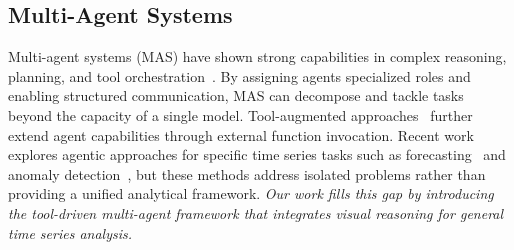 \subsection{Multi-Agent Systems}
Multi-agent systems (MAS) have shown strong capabilities in complex reasoning, planning, and tool orchestration~\cite{wu2024autogen,hong2023metagpt,qian2023chatdev}. 
By assigning agents specialized roles and enabling structured communication, MAS can decompose and tackle tasks beyond the capacity of a single model. 
Tool-augmented approaches~\cite{schick2023toolformer,qin2023toolllm} further extend agent capabilities through external function invocation. 
Recent work explores agentic approaches for specific time series tasks such as forecasting~\cite{huang2025many} and anomaly detection~\cite{gu2025argos,ravuru2024agentic}, but these methods address isolated problems rather than providing a unified analytical framework. \textit{Our work fills this gap by introducing the tool-driven multi-agent framework that integrates visual reasoning for general time series analysis.}
